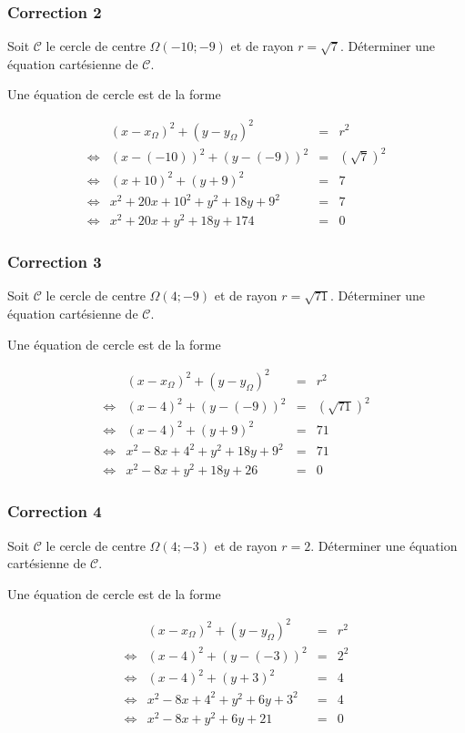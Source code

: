 \documentclass[15pt, mathserif]{beamer}
\begin{document}
\begin{frame}
\vspace{-10mm}
	\frametitle{Correction 2}
Soit $\mathcal{C}$ le cercle de centre $\Omega(-10;-9)$ et de rayon $r=\sqrt{7}$. Déterminer une équation cartésienne de $\mathcal{C}$. 
 
 \bigskip 
 Une équation de cercle est de la forme 
 
 $$\begin{array}{crcl} 
 & (x-x_{\Omega})^2+(y-y_{\Omega})^2 & = &r^2 \\ 
 \Leftrightarrow & (x- \left(-10\right))^2+(y-\left(-9\right))^2 & = & \left(\sqrt{7} \right)^2 \\ 
 \Leftrightarrow & (x+10)^2+(y+9)^2 & = &  7\\ 
 \Leftrightarrow & x^2+20x+10^2+y^2+18y+9^2& = &  7\\ 
 \Leftrightarrow & x^2+20x+y^2+18y+174 & = & 0 
 \end{array}$$ 
 
 \end{frame}


\begin{frame}
\vspace{-10mm}
	\frametitle{Correction 3}
Soit $\mathcal{C}$ le cercle de centre $\Omega(4;-9)$ et de rayon $r=\sqrt{71}$. Déterminer une équation cartésienne de $\mathcal{C}$. 
 
 \bigskip 
 Une équation de cercle est de la forme 
 
 $$\begin{array}{crcl} 
 & (x-x_{\Omega})^2+(y-y_{\Omega})^2 & = &r^2 \\ 
 \Leftrightarrow & (x- 4)^2+(y-\left(-9\right))^2 & = & \left(\sqrt{71} \right)^2 \\ 
 \Leftrightarrow & (x-4)^2+(y+9)^2 & = &  71\\ 
 \Leftrightarrow & x^2-8x+4^2+y^2+18y+9^2& = &  71\\ 
 \Leftrightarrow & x^2-8x+y^2+18y+26 & = & 0 
 \end{array}$$ 
 
 \end{frame}


\begin{frame}
\vspace{-10mm}
	\frametitle{Correction 4}
Soit $\mathcal{C}$ le cercle de centre $\Omega(4;-3)$ et de rayon $r=2$. Déterminer une équation cartésienne de $\mathcal{C}$. 
 
 \bigskip 
 Une équation de cercle est de la forme 
 
 $$\begin{array}{crcl} 
 & (x-x_{\Omega})^2+(y-y_{\Omega})^2 & = &r^2 \\ 
 \Leftrightarrow & (x- 4)^2+(y-\left(-3\right))^2 & = & 2^2 \\ 
 \Leftrightarrow & (x-4)^2+(y+3)^2 & = &  4\\ 
 \Leftrightarrow & x^2-8x+4^2+y^2+6y+3^2& = &  4\\ 
 \Leftrightarrow & x^2-8x+y^2+6y+21 & = & 0 
 \end{array}$$ 
 
 \end{frame}
\end{document}
